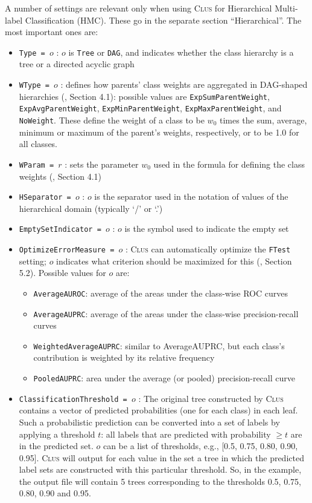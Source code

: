 \documentclass[a4paper]{report}
\newcommand{\clus}{\textsc{Clus}}
\begin{document}
A number of settings are relevant only when using \clus{} for Hierarchical Multi-label Classification (HMC).  These go in the separate section ``Hierarchical''.  The most important ones are:

\begin{itemize}
\item {\tt Type = $o$} : $o$ is {\tt Tree} or {\tt DAG}, and indicates whether the class hierarchy is a tree or a directed acyclic graph \cite{Vens08:jrnl}
\item {\tt WType = $o$} : defines how parents' class weights are aggregated in DAG-shaped hierarchies (\cite{Vens08:jrnl}, Section 4.1): possible values are {\tt ExpSumParentWeight}, {\tt ExpAvgParentWeight}, {\tt ExpMinParentWeight}, {\tt ExpMaxParentWeight}, and {\tt NoWeight}.  These define the weight of a class to be $w_0$ times the sum, average, minimum or maximum of the parent's weights, respectively, or to be 1.0 for all classes. 
\item {\tt WParam = $r$} : sets the parameter $w_0$ used in the formula for defining the class weights (\cite{Vens08:jrnl}, Section 4.1)
\item {\tt HSeparator = $o$} : $o$ is the separator used in the notation of values of the hierarchical domain (typically `/' or `.') 
\item {\tt EmptySetIndicator = $o$} : $o$ is the symbol used to indicate the empty set
\item {\tt OptimizeErrorMeasure = $o$} : \clus{} can automatically optimize the {\tt FTest} setting; $o$ indicates what criterion should be maximized for this (\cite{Vens08:jrnl}, Section 5.2).  Possible values for $o$ are:
  \begin{itemize}
   \item {\tt AverageAUROC}: average of the areas under the class-wise ROC curves
   \item {\tt AverageAUPRC}: average of the areas under the class-wise precision-recall curves
   \item {\tt WeightedAverageAUPRC}: similar to AverageAUPRC, but each class's contribution is weighted by its relative frequency
   \item {\tt PooledAUPRC}: area under the average (or pooled) precision-recall curve
  \end{itemize}
\item {\tt ClassificationThreshold = $o$} : The original tree constructed by \clus{} contains a vector of predicted probabilities (one for each class) in each leaf. Such a probabilistic prediction can be converted into a set of labels by applying a threshold $t$: all labels that are predicted with probability $\geq t$ are in the predicted set.  $o$ can be a list of thresholds, e.g., [0.5, 0.75, 0.80, 0.90, 0.95]. \clus{} will output for each value in the set a tree in which the predicted label sets are constructed with this particular threshold. So, in the example, the output file will contain 5 trees corresponding to the thresholds 0.5, 0.75, 0.80, 0.90 and 0.95.


\end{itemize}
\end{document}
